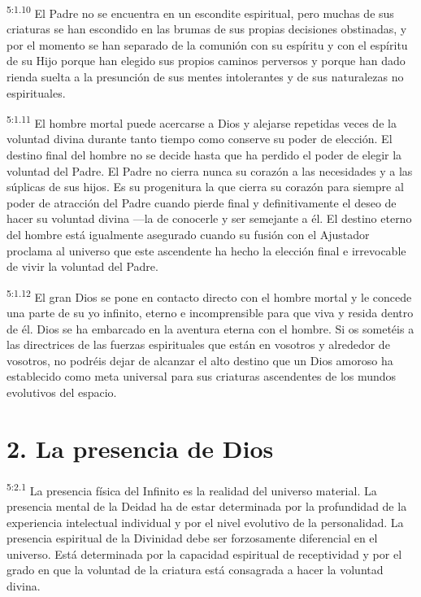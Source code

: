 \par
\textsuperscript{5:1.10} El Padre no se encuentra en un escondite espiritual, pero muchas de sus criaturas se han escondido en las brumas de sus propias decisiones obstinadas, y por el momento se han separado de la comunión con su espíritu y con el espíritu de su Hijo porque han elegido sus propios caminos perversos y porque han dado rienda suelta a la presunción de sus mentes intolerantes y de sus naturalezas no espirituales.

\par
\textsuperscript{5:1.11} El hombre mortal puede acercarse a Dios y alejarse repetidas veces de la voluntad divina durante tanto tiempo como conserve su poder de elección. El destino final del hombre no se decide hasta que ha perdido el poder de elegir la voluntad del Padre. El Padre no cierra nunca su corazón a las necesidades y a las súplicas de sus hijos. Es su progenitura la que cierra su corazón para siempre al poder de atracción del Padre cuando pierde final y definitivamente el deseo de hacer su voluntad divina ---la de conocerle y ser semejante a él. El destino eterno del hombre está igualmente asegurado cuando su fusión con el Ajustador proclama al universo que este ascendente ha hecho la elección final e irrevocable de vivir la voluntad del Padre.

\par
\textsuperscript{5:1.12} El gran Dios se pone en contacto directo con el hombre mortal y le concede una parte de su yo infinito, eterno e incomprensible para que viva y resida dentro de él. Dios se ha embarcado en la aventura eterna con el hombre. Si os sometéis a las directrices de las fuerzas espirituales que están en vosotros y alrededor de vosotros, no podréis dejar de alcanzar el alto destino que un Dios amoroso ha establecido como meta universal para sus criaturas ascendentes de los mundos evolutivos del espacio.

\section*{2. La presencia de Dios}
\par
\textsuperscript{5:2.1} La presencia física del Infinito es la realidad del universo material. La presencia mental de la Deidad ha de estar determinada por la profundidad de la experiencia intelectual individual y por el nivel evolutivo de la personalidad. La presencia espiritual de la Divinidad debe ser forzosamente diferencial en el universo. Está determinada por la capacidad espiritual de receptividad y por el grado en que la voluntad de la criatura está consagrada a hacer la voluntad divina.

